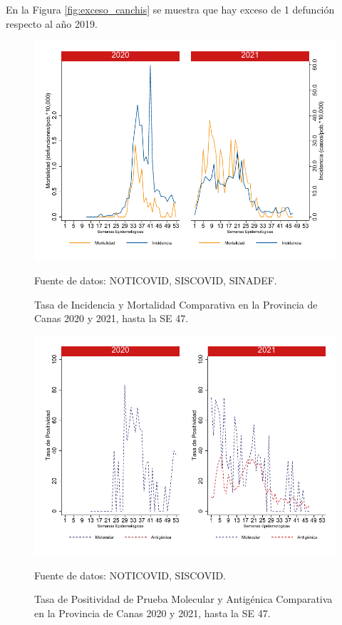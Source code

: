 \documentclass[12pt,a4paper,openany]{book}
\begin{document}
		En la Figura \ref{fig:exceso_canchis} se muestra que hay exceso de 1 defunción respecto al año 2019.
		
		\begin{figure}[h]
			\caption{Tasa de Incidencia y Mortalidad Comparativa en la Provincia de Canas 2020 y 2021, hasta la SE 47.}\label{fig:inc_mort_canchis}
			\begin{center}
				\includegraphics[width=0.7\linewidth]{../figuras/incidencia_mortalidad_20_21_5}
			\end{center}
			{\footnotesize {Fuente de datos: NOTICOVID, SISCOVID, SINADEF.}}
		\end{figure}
		
		\begin{figure}[h]
			\caption{Tasa de Positividad de Prueba Molecular y Antigénica Comparativa en la Provincia de Canas 2020 y 2021, hasta la SE 47.}\label{fig:positividad_canchis}
			\begin{center}
				\includegraphics[width=0.7\linewidth]{../figuras/positividad_20_21_5}
			\end{center}
			{\footnotesize {Fuente de datos: NOTICOVID, SISCOVID.}}
		\end{figure}
		
\end{document}

